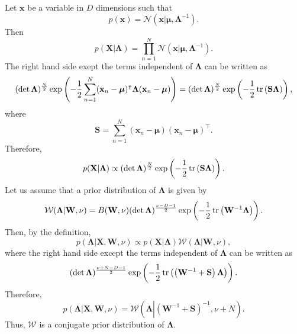 \subsection{}
\label{2.45}
Let $\mathbf{x}$ be a variable in $D$ dimensions such that
%
\begin{equation}
p(\mathbf{x})
=
\mathcal{N}
\left(
	\mathbf{x}
	|
	\bm{\mu},
	\bm{\Lambda} ^ {- 1}
\right).
\end{equation}
%
Then
%
\begin{equation}
p(\mathbf{X} | \bm{\Lambda})
=
\prod_{n = 1}^{N}
\mathcal{N}
\left(
	\mathbf{x}
	|
	\bm{\mu},
	\bm{\Lambda} ^ {- 1}
\right).
\end{equation}
%
The right hand side exept the terms independent of $\bm{\Lambda}$ can be written as
%
\begin{equation}
\begin{aligned}
(\det \bm{\Lambda}) ^ \frac{N}{2}
\exp
\left(
	-
	\frac{1}{2}
	\sum_{n = 1}^{N}
	(\mathbf{x}_n - \bm{\mu}) ^ \intercal
	\bm{\Lambda}
	(\mathbf{x}_n - \bm{\mu})
\right) 
=
(\det \bm{\Lambda}) ^ \frac{N}{2}
\exp
\left(
	-
	\frac{1}{2}
	\tr
	\left(
		\mathbf{S}
		\bm{\Lambda}
	\right)
\right),
\end{aligned}
\end{equation}
%
where
%
\begin{equation}
\mathbf{S}
=
\sum_{n = 1}^{N}
(\mathbf{x}_n - \bm{\mu})
(\mathbf{x}_n - \bm{\mu}) ^ \intercal.
\end{equation}
%
Therefore,
%
\begin{equation}
p(\mathbf{X} | \bm{\Lambda})
\propto
(\det \bm{\Lambda}) ^ \frac{N}{2}
\exp
\left(
	-
	\frac{1}{2}
	\tr
	\left(
		\mathbf{S}
		\bm{\Lambda}
	\right)
\right).
\end{equation}
%
Let us assume that a prior distribution of $\bm{\Lambda}$ is given by
%
\begin{equation}
\mathcal{W}(\bm{\Lambda} | \mathbf{W}, \nu)
=
B(\mathbf{W}, \nu)
(\det \bm{\Lambda}) ^ \frac{\nu - D - 1}{2}
\exp
\left(
	-
	\frac{1}{2}
	\tr 
	\left(
		\mathbf{W} ^ {- 1}
		\bm{\Lambda}
	\right)
\right).
\end{equation}
%
Then, by the definition,
%
\begin{equation}
p(\bm{\Lambda} | \mathbf{X}, \mathbf{W}, \nu)
\propto
p(\mathbf{X} | \bm{\Lambda})
\mathcal{W}(\bm{\Lambda} | \mathbf{W}, \nu),
\end{equation}
%
where the right hand side except the terms independent of $\bm{\Lambda}$ can be written as 
%
\begin{equation}
(\det \bm{\Lambda}) ^ \frac{\nu + N - D - 1}{2}
\exp
\left(
	-
	\frac{1}{2}
	\tr 
	\left(
		\left(
			\mathbf{W} ^ {- 1}
			+
			\mathbf{S}
		\right)
		\bm{\Lambda}
	\right)
\right).
\end{equation}
%
Therefore,
%
\begin{equation}
p(\bm{\Lambda} | \mathbf{X}, \mathbf{W}, \nu)
=
\mathcal{W} 
\left(
	\bm{\Lambda} 
	\left.
	\right \vert
	\left(
		\mathbf{W} ^ {- 1}
		+
		\mathbf{S}
	\right) ^ {- 1},
	\nu 
	+ 
	N
\right).
\end{equation}
%
Thus, $\mathcal{W}$ is a conjugate prior distribution of $\bm{\Lambda}$.


